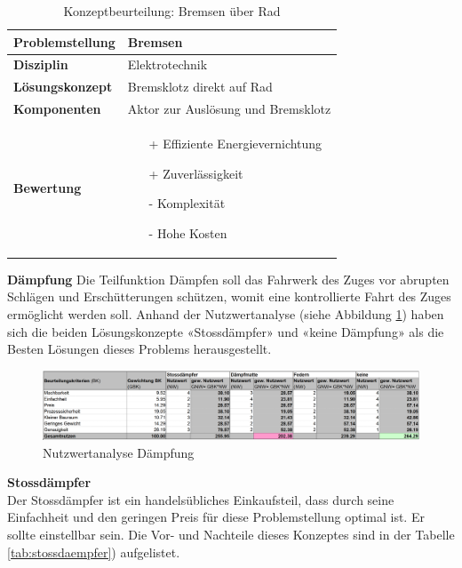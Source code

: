 \documentclass[../../main.tex]{subfiles}
\begin{document}
\begin{flushleft}
    \begin{table}[h]
    \begin{tabular}{ | l | p{11cm} |}
    \hline
    \textbf{Problemstellung} & Bremsen \\ \hline
    \textbf{Disziplin} & Elektrotechnik \\ \hline
    \textbf{Lösungskonzept} & Bremsklotz direkt auf Rad \\ \hline
    \textbf{Komponenten} & Aktor zur Auslösung und Bremsklotz \\ \hline
    \textbf{Bewertung} &  \begin{itemize}
                            \item[+] Effiziente Energievernichtung
                            \item[+] Zuverlässigkeit
                            \item[-] Komplexität 
                            \item[-] Hohe Kosten
                          \end{itemize} \\ \hline
    \end{tabular}
    \caption{Konzeptbeurteilung: Bremsen über Rad}
    \label{tab:radbremse}
\end{table}
\end{flushleft}

  \textbf{Dämpfung}
  Die Teilfunktion Dämpfen soll das Fahrwerk des Zuges vor abrupten Schlägen und Erschütterungen schützen, womit eine kontrollierte Fahrt des Zuges ermöglicht werden soll. Anhand der Nutzwertanalyse (siehe Abbildung \ref{fig:daempfung}) haben sich die beiden Lösungskonzepte «Stossdämpfer» und «keine Dämpfung» als die Besten Lösungen dieses Problems herausgestellt.

  \begin{figure}[H] %
    \centering
    \includegraphics[width=1\textwidth]{Daempfung}
    \caption{Nutzwertanalyse Dämpfung}
    \label{fig:daempfung}
\end{figure}

  \textbf{Stossdämpfer}\\
  Der Stossdämpfer ist ein handelsübliches Einkaufsteil, dass durch seine Einfachheit und den geringen Preis für diese Problemstellung optimal ist. Er sollte einstellbar sein. Die Vor- und Nachteile dieses Konzeptes sind in der Tabelle \ref{tab:stossdaempfer}) aufgelistet.
\end{document}
